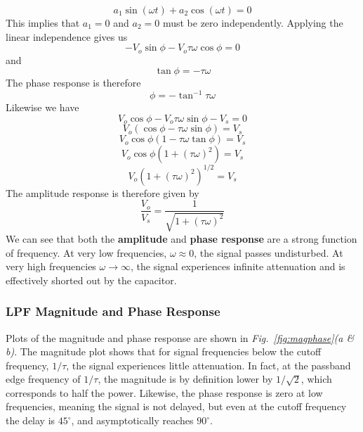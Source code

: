     \begin{equation}
        a_1 \sin(\omega t) + a_2 \cos(\omega t) = 0
    \end{equation}
This implies that $a_1 = 0$ and $a_2 = 0$ must be zero independently.  Applying the linear independence gives us
    \begin{equation}
        -V_o \sin\phi - V_o \tau \omega \cos \phi = 0
    \end{equation}
and
    \begin{equation}
        \tan \phi = -\tau \omega
    \end{equation}
The phase response is therefore 
    \begin{equation}
        \phi = - \tan^{-1} \tau \omega
    \end{equation}
Likewise we have
    \begin{equation}
        V_o \cos\phi - V_o \tau \omega \sin\phi - V_s = 0
    \end{equation}
    \begin{equation}
        V_o (\cos \phi - \tau \omega \sin\phi) = V_s
    \end{equation}
    \begin{equation}
        V_o \cos \phi (1  - \tau \omega \tan\phi) = V_s
    \end{equation}
    \begin{equation}
        V_o \cos \phi (1  + (\tau \omega)^2 ) = V_s
    \end{equation}
    \begin{equation}
        V_o (1  + (\tau \omega)^2 )^{1/2} = V_s
    \end{equation}
 The amplitude response is therefore given by
    \begin{equation}
        \frac{V_o}{V_s} = \frac{1}{\sqrt{1 + (\tau \omega)^2}}
    \end{equation}
We can see that both the \textbf{amplitude} and \textbf{phase response} are a strong function of frequency.  At very low frequencies, $\omega \approx 0$, the signal passes undisturbed.  At very high frequencies $\omega \rightarrow \infty$, the signal experiences infinite attenuation and is effectively shorted out by the capacitor.
\newpage
\subsubsection{LPF Magnitude and Phase Response}
Plots of the magnitude and phase response are shown in \emph{Fig.~\ref{fig:magphase}(a \& b)}.  The magnitude plot shows that for signal frequencies below the cutoff frequency, $1/\tau$, the signal experiences little attenuation.  In fact, at the passband edge frequency of $1/\tau$, the magnitude is by definition lower by $1/\sqrt{2}$, which corresponds to half the power.  Likewise, the phase response is zero at low frequencies, meaning the signal is not delayed, but even at the cutoff frequency the delay is $45^\circ$, and asymptotically reaches $90^\circ$.

